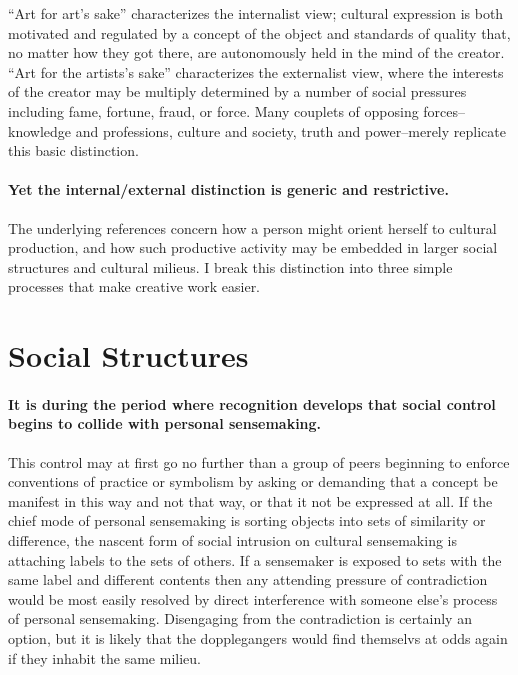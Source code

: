 \documentclass[]{article}
\begin{document}
``Art for art's sake'' characterizes the internalist view; cultural
expression is both motivated and regulated by a concept of the object
and standards of quality that, no matter how they got there, are
autonomously held in the mind of the creator. ``Art for the artists's
sake'' characterizes the externalist view, where the interests of the
creator may be multiply determined by a number of social pressures
including fame, fortune, fraud, or force. Many couplets of opposing
forces--knowledge and professions, culture and society, truth and
power--merely replicate this basic distinction.

\paragraph{Yet the internal/external distinction is generic and
restrictive.}\label{yet-the-internalexternal-distinction-is-generic-and-restrictive.}

The underlying references concern how a person might orient herself to
cultural production, and how such productive activity may be embedded in
larger social structures and cultural milieus. I break this distinction
into three simple processes that make creative work easier.

\section{Social Structures}\label{social-structures}

\paragraph{It is during the period where recognition develops that
social control begins to collide with personal
sensemaking.}\label{it-is-during-the-period-where-recognition-develops-that-social-control-begins-to-collide-with-personal-sensemaking.}

This control may at first go no further than a group of peers beginning
to enforce conventions of practice or symbolism by asking or demanding
that a concept be manifest in this way and not that way, or that it not
be expressed at all. If the chief mode of personal sensemaking is
sorting objects into sets of similarity or difference, the nascent form
of social intrusion on cultural sensemaking is attaching labels to the
sets of others. If a sensemaker is exposed to sets with the same label
and different contents then any attending pressure of contradiction
would be most easily resolved by direct interference with someone else's
process of personal sensemaking. Disengaging from the contradiction is
certainly an option, but it is likely that the dopplegangers would find
themselvs at odds again if they inhabit the same milieu.
\end{document}
